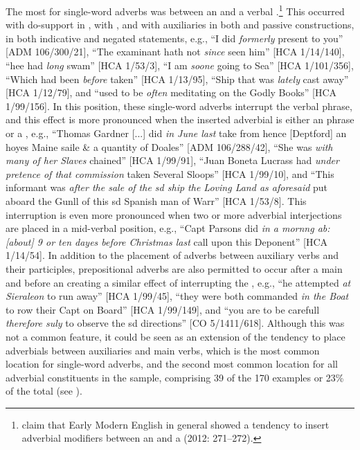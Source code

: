 {The most  for single-word adverbs was between an  and a verbal .\footnote{\citeauthor{MillwardHayes2012} claim that Early Modern English in general showed a tendency to insert adverbial modifiers between an  and a  (2012: 271–272).} This occurred with do-support in , with , and with  auxiliaries in both  and passive constructions, in both indicative and negated statements, e.g., “I did \textit{formerly} present to you” [ADM 106/300/21], “The examinant hath not \textit{since} seen him” [HCA 1/14/140], “hee had \textit{long} swam” [HCA 1/53/3], “I am \textit{soone} going to Sea” [HCA 1/101/356], “Which had been \textit{before} taken” [HCA 1/13/95], “Ship that was \textit{lately} cast away” [HCA 1/12/79], and “used to be \textit{often} meditating on the Godly Books” [HCA 1/99/156]. In this position, these single-word adverbs interrupt the verbal phrase, and this effect is more pronounced when the inserted adverbial is either an  phrase or a , e.g., “Thomas Gardner [...] did \textit{in June last} take from hence [Deptford] an hoyes Maine saile \& a quantity of Doales” [ADM 106/288/42], “She was \textit{with many of her Slaves} chained” [HCA 1/99/91],  “Juan Boneta Lucrass had \textit{under pretence of that commission} taken Several Sloops” [HCA 1/99/10], and “This informant was \textit{after the sale of the sd ship the Loving Land as aforesaid} put aboard the Gunll of this sd Spanish man of Warr” [HCA 1/53/8]. This interruption is even more pronounced when two or more adverbial interjections are placed in a mid-verbal position, e.g., “Capt Parsons did \textit{in a mornng ab:[about] 9 or ten dayes before Christmas last} call upon this Deponent” [HCA 1/14/54]. In addition to the placement of adverbs between auxiliary verbs and their participles, prepositional adverbs are also permitted to occur after a main  and before an  creating a similar effect of interrupting the , e.g., “he attempted \textit{at Sieraleon} to run away” [HCA 1/99/45], “they were both commanded \textit{in the Boat} to row their Capt on Board”  [HCA 1/99/149], and “you are to be carefull \textit{therefore suly} to observe the sd directions” [CO 5/1411/618]. Although this was not a common feature, it could be seen as an extension of the tendency to place adverbials between auxiliaries and main verbs, which is the most common location for single-word adverbs, and the second most common location for all adverbial constituents in the sample, comprising 39 of the 170 examples or 23\% of the total (see ).
}

